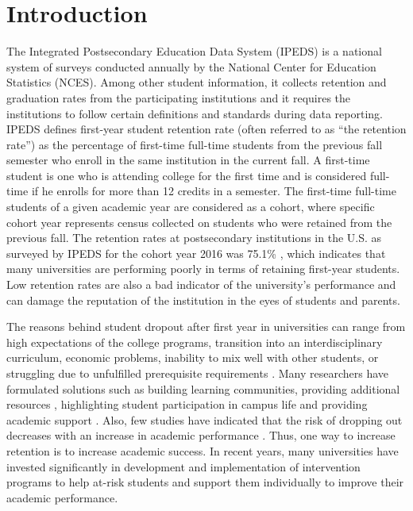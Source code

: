 \documentclass[11pt,openright]{report}
\begin{document}
\chapter{Introduction}\label{chapter:introduction} 
The Integrated Postsecondary Education Data System (IPEDS) is a national system of surveys conducted annually by the National Center for Education Statistics (NCES). Among other student information, it collects retention and graduation rates from the participating institutions and it requires the institutions to follow certain definitions and standards during data reporting. IPEDS defines first-year student retention rate (often referred to as ``the retention rate'') as the percentage of first-time full-time students from the previous fall semester who enroll in the same institution in the current fall.  A first-time student is one who is attending college for the first time and is considered full-time if he enrolls for more than 12 credits in a semester. The first-time full-time students of a given academic year are considered as a cohort, where specific cohort year represents census collected on students who were retained from the previous fall. The retention rates at postsecondary institutions in the U.S. as surveyed by IPEDS for the cohort year 2016 was 75.1\% \cite{IPEDSRetentionRate}, which indicates that many universities are performing poorly in terms of retaining first-year students. Low retention rates are also a bad indicator of the university's performance and can damage the reputation of the institution in the eyes of students and parents. 

The reasons behind student dropout after first year in universities can range from high expectations of the college programs, transition into an interdisciplinary curriculum, economic problems, inability to mix well with other students, or struggling due to unfulfilled prerequisite requirements \cite{lau2003institutional}. Many researchers have formulated solutions such as building learning communities, providing additional resources \cite{tinto1999taking}, highlighting student participation in campus life and providing academic support \cite{lau2003institutional}. Also, few studies have indicated that the risk of dropping out decreases with an increase in academic performance \cite{Murtaugh}. Thus, one way to increase retention is to increase academic success. In recent years, many universities have invested significantly in development and implementation of intervention programs to help at-risk students and support them individually to improve their academic performance. 
\end{document}
